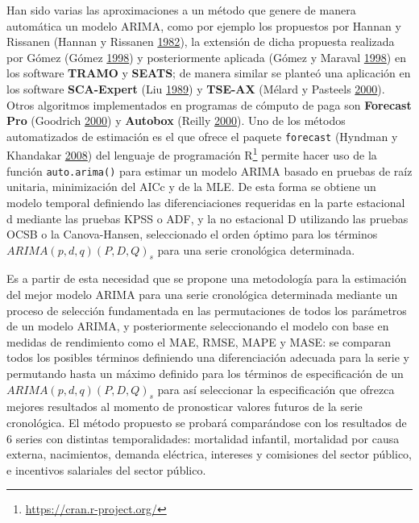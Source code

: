 \documentclass[12pt]{article}
\let\rmarkdownfootnote\footnote%
\def\footnote{\protect\rmarkdownfootnote}
\begin{document}
Han sido varias las aproximaciones a un método que genere de manera
automática un modelo ARIMA, como por ejemplo los propuestos por Hannan y
Rissanen (Hannan y Rissanen \protect\hyperlink{ref-hannan}{1982}), la
extensión de dicha propuesta realizada por Gómez (Gómez
\protect\hyperlink{ref-gomez}{1998}) y posteriormente aplicada (Gómez
y Maraval \protect\hyperlink{ref-tramo}{1998}) en los software
\textbf{TRAMO} y \textbf{SEATS}; de manera similar se planteó una
aplicación en los software \textbf{SCA-Expert} (Liu
\protect\hyperlink{ref-liu}{1989}) y \textbf{TSE-AX} (Mélard y
Pasteels \protect\hyperlink{ref-melard}{2000}). Otros algoritmos
implementados en programas de cómputo de paga son \textbf{Forecast Pro}
(Goodrich \protect\hyperlink{ref-forecastpro}{2000}) y \textbf{Autobox}
(Reilly \protect\hyperlink{ref-autobox}{2000}). Uno de los métodos
automatizados de estimación es el que ofrece el paquete
\texttt{forecast} (Hyndman y Khandakar
\protect\hyperlink{ref-auto.arima}{2008}) del lenguaje de programación
R\footnote{\url{https://cran.r-project.org/}} permite hacer uso de la
función \texttt{auto.arima()} para estimar un modelo ARIMA basado en
pruebas de raíz unitaria, minimización del AICc y de la MLE. De esta
forma se obtiene un modelo temporal definiendo las diferenciaciones
requeridas en la parte estacional d mediante las pruebas KPSS o ADF, y
la no estacional D utilizando las pruebas OCSB o la Canova-Hansen,
seleccionado el orden óptimo para los términos \(ARIMA(p,d,q)(P,D,Q)_s\)
para una serie cronológica determinada.

Es a partir de esta necesidad que se propone una metodología para la
estimación del mejor modelo ARIMA para una serie cronológica determinada
mediante un proceso de selección fundamentada en las permutaciones de
todos los parámetros de un modelo ARIMA, y posteriormente seleccionando
el modelo con base en medidas de rendimiento como el MAE, RMSE, MAPE y
MASE: se comparan todos los posibles términos definiendo una
diferenciación adecuada para la serie y permutando hasta un máximo
definido para los términos de especificación de un
\(ARIMA(p,d,q)(P,D,Q)_s\) para así seleccionar la especificación que
ofrezca mejores resultados al momento de pronosticar valores futuros de
la serie cronológica. El método propuesto se probará comparándose con
los resultados de 6 series con distintas temporalidades: mortalidad
infantil, mortalidad por causa externa, nacimientos, demanda eléctrica,
intereses y comisiones del sector público, e incentivos salariales del
sector público.
\end{document}
